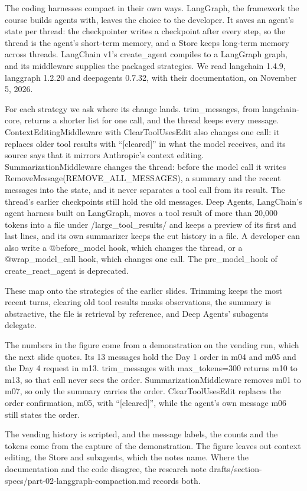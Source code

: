 The coding harnesses compact in their own ways. LangGraph, the framework the course builds agents with, leaves the choice to the developer. It saves an agent's state per thread: the checkpointer writes a checkpoint after every step, so the thread is the agent's short-term memory, and a Store keeps long-term memory across threads. LangChain v1's create\_agent compiles to a LangGraph graph, and its middleware supplies the packaged strategies. We read langchain 1.4.9, langgraph 1.2.20 and deepagents 0.7.32, with their documentation, on November 5, 2026.

For each strategy we ask where its change lands. trim\_messages, from langchain-core, returns a shorter list for one call, and the thread keeps every message. ContextEditingMiddleware with ClearToolUsesEdit also changes one call: it replaces older tool results with ``[cleared]'' in what the model receives, and its source says that it mirrors Anthropic's context editing. SummarizationMiddleware changes the thread: before the model call it writes RemoveMessage(REMOVE\_ALL\_MESSAGES), a summary and the recent messages into the state, and it never separates a tool call from its result. The thread's earlier checkpoints still hold the old messages. Deep Agents, LangChain's agent harness built on LangGraph, moves a tool result of more than 20,000 tokens into a file under /large\_tool\_results/ and keeps a preview of its first and last lines, and its own summarizer keeps the cut history in a file. A developer can also write a @before\_model hook, which changes the thread, or a @wrap\_model\_call hook, which changes one call. The pre\_model\_hook of create\_react\_agent is deprecated.

These map onto the strategies of the earlier slides. Trimming keeps the most recent turns, clearing old tool results masks observations, the summary is abstractive, the file is retrieval by reference, and Deep Agents' subagents delegate.

The numbers in the figure come from a demonstration on the vending run, which the next slide quotes. Its 13 messages hold the Day 1 order in m04 and m05 and the Day 4 request in m13. trim\_messages with max\_tokens=300 returns m10 to m13, so that call never sees the order. SummarizationMiddleware removes m01 to m07, so only the summary carries the order. ClearToolUsesEdit replaces the order confirmation, m05, with ``[cleared]'', while the agent's own message m06 still states the order.

The vending history is scripted, and the message labels, the counts and the tokens come from the capture of the demonstration. The figure leaves out context editing, the Store and subagents, which the notes name. Where the documentation and the code disagree, the research note drafts/section-specs/part-02-langgraph-compaction.md records both.

